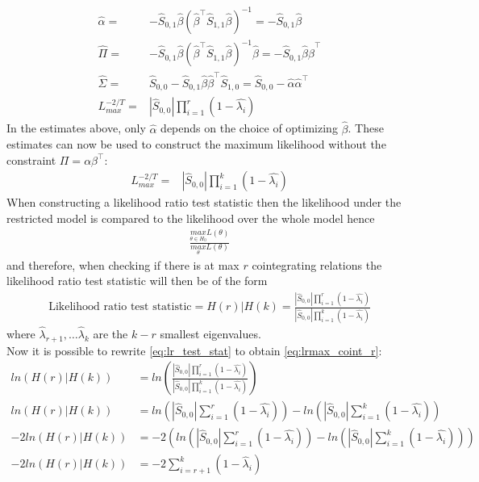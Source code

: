 \begin{bevis}
\begin{align*}
    \hat{\alpha}=&-\hat{S}_{0,1}\hat{\beta}(\hat{\beta}^\top \hat{S}_{1,1}\hat{\beta})^{-1}=-\hat{S}_{0,1}\hat{\beta}\\
    \hat{\Pi}=&-\hat{S}_{0,1}\hat{\beta}(\hat{\beta}^\top \hat{S}_{1,1}\hat{\beta})^{-1}\hat{\beta}=-\hat{S}_{0,1}\hat{\beta}\hat{\beta}^\top\\
    \hat{\Sigma}=&\hat{S}_{0,0}-\hat{S}_{0,1}\hat{\beta}\hat{\beta}^\top\hat{S}_{1,0}=\hat{S}_{0,0}-\hat{\alpha}\hat{\alpha}^\top\\
    L_{max}^{-2/T}=&|\hat{S}_{0,0}|\prod_{i=1}^r(1-\hat{\lambda_i})
\end{align*}
In the estimates above, only $\hat{\alpha}$ depends on the choice of optimizing $\hat{\beta}$. These estimates can now be used to construct the maximum likelihood without the constraint $\Pi=\alpha\beta^{\top}$:
\begin{align*}
    L_{max}^{-2/T}=&|\hat{S}_{0,0}|\prod_{i=1}^k(1-\hat{\lambda_i})
\end{align*}
When constructing a likelihood ratio test statistic then the likelihood under the restricted model is compared to the likelihood over the whole model hence
\begin{align*}
    \frac{\underset{\theta\in H_0}{max}L(\theta)}{\underset{\theta}{max}L(\theta)}
\end{align*}
and therefore, when checking if there is at max $r$ cointegrating relations the likelihood ratio test statistic will then be of the form
\begin{align}\label{eq:lr_test_stat}
\text{Likelihood ratio test statistic}=H(r)|H(k)=\frac{|\hat{S}_{0,0}|\prod_{i=1}^r (1-\hat{\lambda_i})}{|\hat{S}_{0,0}|\prod_{i=1}^k(1-\hat{\lambda_i})}
\end{align}
where $\hat{\lambda}_{r+1},\ldots\hat{\lambda}_k$ are the $k-r$ smallest eigenvalues.\\
Now it is possible to rewrite \eqref{eq:lr_test_stat} to obtain \eqref{eq:lrmax_coint_r}:
\begin{align*}
ln(H(r)|H(k))&=ln\left(\frac{|\hat{S}_{0,0}|\prod_{i=1}^r (1-\hat{\lambda_i})}{|\hat{S}_{0,0}|\prod_{i=1}^k(1-\hat{\lambda_i})}\right)\\
    ln(H(r)|H(k))&=ln\left(|\hat{S}_{0,0}| \sum_{i=1}^r (1-\hat{\lambda_i})\right)-ln\left(|\hat{S}_{0,0}|\sum_{i=1}^k (1-\hat{\lambda_i})\right)\\
    -2ln(H(r)|H(k))&=-2\left( ln\left(|\hat{S}_{0,0}| \sum_{i=1}^r (1-\hat{\lambda_i})\right)-ln\left(|\hat{S}_{0,0}|\sum_{i=1}^k (1-\hat{\lambda_i})\right)\right)\\
    -2ln(H(r)|H(k))&=-2\sum_{i=r+1}^k(1-\hat{\lambda}_i)
\end{align*}

\end{bevis} 




